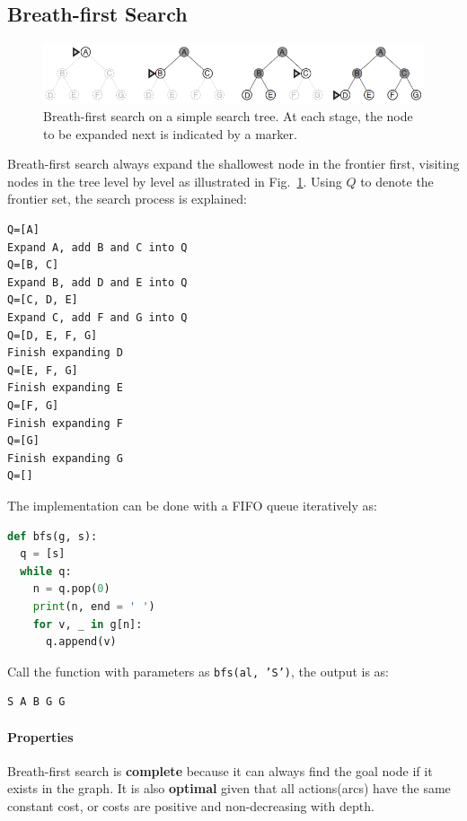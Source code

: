 \documentclass[main.tex]{subfiles}
\begin{document}
\subsection{Breath-first Search}
\begin{figure}[!ht]
    \centering
    \includegraphics[width=0.96\columnwidth]{fig/general_breath_first_search.png}
        \caption{Breath-first search on a simple search tree. At each stage, the node to be expanded next is indicated by a marker. }
    \label{fig:breath_first_search_strategy}
\end{figure}
Breath-first search always expand the shallowest node in the frontier first, visiting nodes in the tree level by level as illustrated in Fig.~\ref{fig:breath_first_search_strategy}. Using $Q$ to denote the frontier set, the search process is explained:
\begin{lstlisting}[numbers=none]
Q=[A]
Expand A, add B and C into Q
Q=[B, C]
Expand B, add D and E into Q
Q=[C, D, E]
Expand C, add F and G into Q
Q=[D, E, F, G]
Finish expanding D
Q=[E, F, G]
Finish expanding E
Q=[F, G]
Finish expanding F
Q=[G]
Finish expanding G
Q=[]
\end{lstlisting}
The implementation can be done with a FIFO queue iteratively as:
\begin{lstlisting}[language=Python]
def bfs(g, s):
  q = [s]
  while q:
    n = q.pop(0)
    print(n, end = ' ')
    for v, _ in g[n]:
      q.append(v)
\end{lstlisting}
Call the function with parameters as \texttt{bfs(al, 'S')}, the output is as:
\begin{lstlisting}[numbers=none]
S A B G G 
\end{lstlisting}


\paragraph{Properties} Breath-first search is \textbf{complete} because it can always find the goal node if it exists in the graph. It is also \textbf{optimal} given that all actions(arcs) have the same constant cost, or costs are positive and non-decreasing with depth. 
\end{document}

